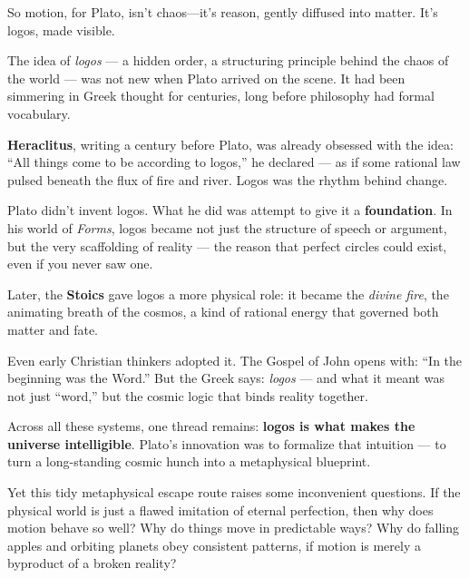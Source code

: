 So motion, for Plato, isn’t chaos—it’s reason, gently diffused into matter. It’s logos, made visible.


\begin{tcolorbox}[title=Historical Sidebar: Logos as the Mind of the Cosmos, colback=gray!5, colframe=black, fonttitle=\bfseries]

  The idea of \textit{logos} — a hidden order, a structuring principle behind the chaos of the world — was not new when Plato arrived on the scene. It had been simmering in Greek thought for centuries, long before philosophy had formal vocabulary.
  
  \medskip
  
  \textbf{Heraclitus}, writing a century before Plato, was already obsessed with the idea: “All things come to be according to logos,” he declared — as if some rational law pulsed beneath the flux of fire and river. Logos was the rhythm behind change.
  
  \medskip
  
  Plato didn’t invent logos. What he did was attempt to give it a \textbf{foundation}. In his world of \textit{Forms}, logos became not just the structure of speech or argument, but the very scaffolding of reality — the reason that perfect circles could exist, even if you never saw one.
  
  \medskip
  
  Later, the \textbf{Stoics} gave logos a more physical role: it became the \textit{divine fire}, the animating breath of the cosmos, a kind of rational energy that governed both matter and fate.
  
  \medskip
  
  Even early Christian thinkers adopted it. The Gospel of John opens with: “In the beginning was the Word.” But the Greek says: \textit{logos} — and what it meant was not just “word,” but the cosmic logic that binds reality together.
  
  \medskip
  
  Across all these systems, one thread remains: \textbf{logos is what makes the universe intelligible}. Plato’s innovation was to formalize that intuition — to turn a long-standing cosmic hunch into a metaphysical blueprint.
  
\end{tcolorbox}

\medskip

Yet this tidy metaphysical escape route raises some inconvenient questions. If the physical world is just a flawed imitation of eternal perfection, then why does motion behave so well? Why do things move in predictable ways? Why do falling apples and orbiting planets obey consistent patterns, if motion is merely a byproduct of a broken reality?

